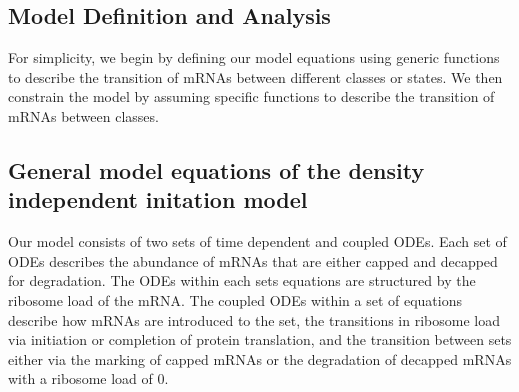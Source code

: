 \documentclass[review]{elsarticle}
\begin{document}
\subsection{Model Definition and Analysis}
For simplicity, we begin by defining our model equations using generic functions to describe the transition of mRNAs between different classes or states.
We then constrain the model by assuming specific functions to describe the transition of mRNAs between classes.

\subsection*{General model equations of the density independent initation model}
Our model consists of two sets of time dependent and coupled ODEs.
Each set of ODEs describes the abundance of mRNAs that are either capped and decapped for degradation.
The ODEs within each sets equations are structured by the ribosome load of the mRNA.
The coupled ODEs within a set of equations describe how mRNAs are introduced to the set, the transitions in ribosome load via initiation or completion of protein translation,  and the transition between sets either via the marking of capped mRNAs or the degradation of decapped mRNAs with a ribosome load of 0.
\end{document}
